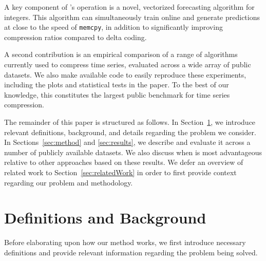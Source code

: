 A key component of \mine's operation is a novel, vectorized forecasting algorithm for integers. This algorithm can simultaneously train online and generate predictions at close to the speed of \texttt{memcpy}, in addition to significantly improving compression ratios compared to delta coding.

A second contribution is an empirical comparison of a range of algorithms currently used to compress time series, evaluated across a wide array of public datasets. We also make available code to easily reproduce these experiments, including the plots and statistical tests in the paper. To the best of our knowledge, this constitutes the largest public benchmark for time series compression.

The remainder of this paper is structured as follows. In Section~\ref{sec:problem}, we introduce relevant definitions, background, and details regarding the problem we consider. In Sections~\ref{sec:method} and \ref{sec:results}, we describe \minesp and evaluate it across a number of publicly available datasets. We also discuss when \minesp is most advantageous relative to other approaches based on these results. We defer an overview of related work to Section~\ref{sec:relatedWork} in order to first provide context regarding our problem and methodology.





\section{Definitions and Background} \label{sec:problem}

Before elaborating upon how our method works, we first introduce necessary definitions and provide relevant information regarding the problem being solved.

